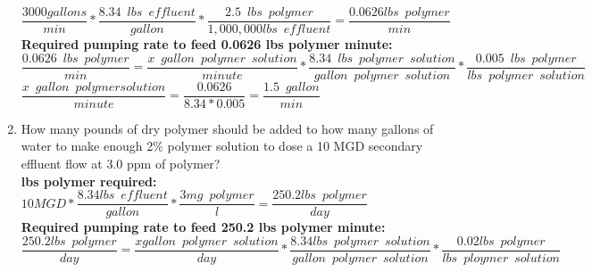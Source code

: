 \documentclass{article}
\begin{document}
\begin{enumerate}
$\dfrac{3000 gallons}{min}*\dfrac{8.34 \enspace lbs \enspace effluent}{gallon}*\dfrac{2.5 \enspace lbs \enspace polymer}{1,000,000 lbs \enspace effluent}=\dfrac{0.0626 lbs \enspace polymer}{min}$\\
\vspace{0.25cm}
\textbf{Required pumping rate to feed 0.0626 lbs polymer minute:}\\
\vspace{0.25cm}
$\dfrac{0.0626 \enspace lbs \enspace polymer}{min}=\dfrac{x \enspace gallon \enspace polymer  \enspace solution}{minute}*\dfrac{8.34 \enspace lbs \enspace polymer \enspace solution}{gallon \enspace polymer \enspace solution}*\dfrac{0.005 \enspace lbs \enspace polymer}{lbs \enspace polymer \enspace solution}$\\
\vspace{0.25cm}
$\dfrac{x \enspace gallon \enspace polymer solution}{minute}=\dfrac{0.0626}{8.34*0.005}=\boxed{\dfrac{1.5 \enspace gallon}{min}}$\\
\vspace{0.25cm}
\item How many pounds of dry polymer should be added to how many gallons  of water  to make enough 2\% polymer  solution to dose a 10 MGD secondary  effluent flow at 3.0 ppm of polymer?\\
\vspace{0.25cm}
\textbf{lbs polymer required:}\\
\vspace{0.25cm}
$10 MGD*\dfrac{8.34lbs \enspace effluent}{gallon}*\dfrac{3mg \enspace polymer}{l}=\dfrac{250.2 lbs \enspace polymer}{day}$\\
\vspace{0.25cm}
\textbf{Required pumping rate to feed 250.2 lbs polymer minute:}\\
\vspace{0.25cm}
$\dfrac{250.2 lbs \enspace polymer}{day}=\dfrac{x gallon \enspace polymer \enspace solution}{day}*\dfrac{8.34 lbs \enspace polymer \enspace solution}{gallon \enspace polymer \enspace solution}*\dfrac{0.02 lbs \enspace polymer}{lbs \enspace ploymer \enspace solution}$\\


\end{enumerate}
\end{document}
